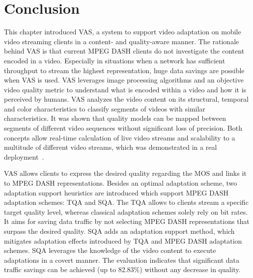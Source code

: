 \section{Conclusion}
This chapter introduced \ac{VAS}, a system to support video adaptation on mobile video streaming clients in a content- and quality-aware manner.
The rationale behind \ac{VAS} is that current \ac{MPEG} \ac{DASH} clients do not investigate the content encoded in a video. %
Especially in situations when a network has sufficient throughput to stream the highest representation, huge data savings are possible when \ac{VAS} is used.
\ac{VAS} leverages image processing algorithms and an objective video quality metric to understand what is encoded within a video and how it is perceived by humans.
\ac{VAS} analyzes the video content on its structural, temporal and color characteristics to classify segments of videos with similar characteristics. 
It was shown that quality models can be mapped between segments of different video sequences without significant loss of precision.
Both concepts allow real-time calculation of live video streams and scalability to a multitude of different video streams, which was demonstrated in a real deployment~\cite{Wilk2016c}.

\ac{VAS} allows clients to express the desired quality regarding the \ac{MOS} and links it to \ac{MPEG} \ac{DASH} representations.
Besides an optimal adaptation scheme, 
two adaptation support heuristics are introduced which support \ac{MPEG} \ac{DASH} adaptation schemes: \ac{TQA} and \ac{SQA}.
The \ac{TQA} allows to clients stream a specific target quality level, whereas classical adaptation schemes solely rely on bit rates.
It aims for saving data traffic by not selecting \ac{MPEG} \ac{DASH} representations that surpass the desired quality.
\ac{SQA} adds an adaptation support method, which mitigates adaptation effects introduced by \ac{TQA} and \ac{MPEG} \ac{DASH} adaptation schemes.
\ac{SQA} leverages the knowledge of the video content to execute adaptations in a covert manner.
The evaluation indicates that significant data traffic savings can be achieved (up to 82.83\%) without any decrease in quality.
